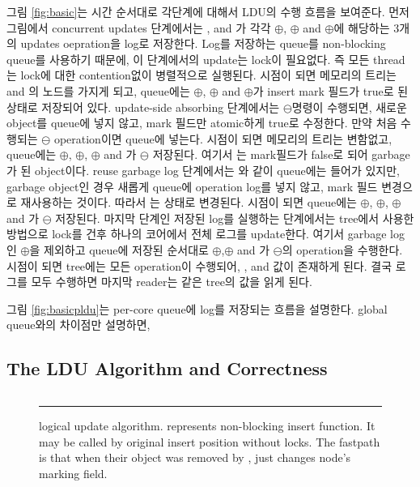 %
\ifkor
그림 \ref{fig:basic}는 시간 순서대로 각단계에 대해서 LDU의 수행 흐름을 보여준다.
먼저 그림에서 concurrent updates 단계에서는 ,  and 가 각각
$\oplus$, $\oplus$ and
$\oplus$에 해당하는 3개의 updates oepration을 log로 저장한다. 
Log를 저장하는 queue를 non-blocking queue를 사용하기 때문에, 이 단계에서의 update는 lock이 필요없다. 
즉 모든 thread는 lock에 대한 contention없이 병렬적으로 실행된다. 
 시점이 되면 메모리의 트리는  and 의 노드를 가지게 되고, queue에는 
$\oplus$, $\oplus$ and $\oplus$가 insert mark 필드가
true로 된 상태로 저장되어 있다. 
update-side absorbing 단계에서는  $\ominus$명령이 수행되면, 새로운 object를 queue에 넣지
않고, mark 필드만 atomic하게 true로 수정한다.  
만약 처음 수행되는 $\ominus$ operation이면 queue에 넣는다.
 시점이 되면 메모리의 트리는 변함없고, queue에는 
$\oplus$, $\oplus$, $\oplus$ and 가
$\ominus$ 저장된다. 여기서 는 mark필드가 false로 되어 garbage가 된 object이다.
reuse garbage log 단계에서는 와 같이 queue에는 들어가 있지만, garbage object인 경우 새롭게
queue에 operation log를 넣지 않고, mark 필드 변경으로 재사용하는 것이다. 
따라서 는  상태로 변경된다. 
 시점이 되면 queue에는 
$\oplus$, $\oplus$, $\oplus$ and 가
$\ominus$ 저장된다.
마지막 단계인 저장된 log를 실행하는 단계에서는 tree에서 사용한 방법으로 lock를 건후 하나의 코어에서 
전체 로그를 update한다. 여기서 garbage log인  $\oplus$을 제외하고 queue에 저장된 순서대로 
$\oplus$,$\oplus$ and 가 $\ominus$의 operation을
수행한다.  시점이 되면 tree에는 
모든 operation이 수행되어, ,  and  값이 존재하게 된다.
결국 로그를 모두 수행하면 마지막 reader는 같은 tree의 값을 읽게 된다. 

그림 \ref{fig:basicpldu}는 per-core queue에 log를 저장되는 흐름을 설명한다.
global queue와의 차이점만 설명하면,

\else





\fi

\subsection{The LDU Algorithm and Correctness}
\begin{figure}[tb!]
\inputminted[linenos,fontsize=\footnotesize, tabsize=2]{c}{src/ldu_logical.c}
\rule{\columnwidth}{0.5pt}
\vspace{-\baselineskip}
\caption{ logical update algorithm.  represents
 non-blocking insert function.
It may be called by original insert position without locks. The fastpath is
 that when their object was removed by ,
  just changes node's marking field.}
\label{fig:gldulogicalupdate}
\end{figure}

